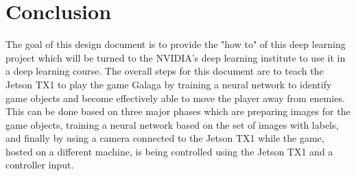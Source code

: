 \documentclass{onecolumn, draftclsnofoot,10pt, compsoc}[IEEEtran]
\begin{document}
\section{Conclusion}
The goal of this design document is to provide the "how to" of this deep learning project which will be turned to the NVIDIA's deep learning institute to use it in a deep learning course.
The overall steps for this document are to teach the Jetson TX1 to play the game Galaga by training a neural network to identify game objects and become effectively able to move the player away from enemies.
This can be done based on three major phases which are preparing images for the game objects, training a neural network based on the set of images with labels, and finally by using a camera connected to the Jetson TX1 while the game, hosted on a different machine, is being controlled using the Jetson TX1 and a controller input.
\end{document}
